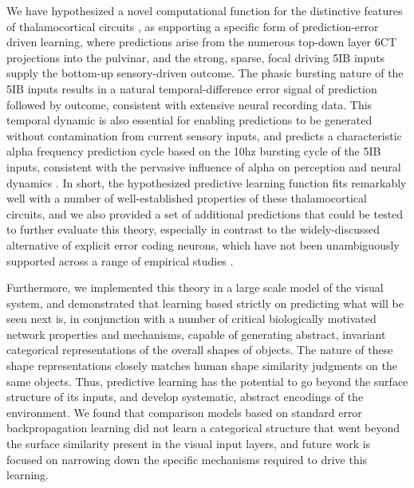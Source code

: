 \documentclass[11pt,twoside]{article}
\newif\myifpdf
\begin{document}
We have hypothesized a novel computational function for the distinctive features of thalamocortical circuits \citep{ShermanGuillery06,UsreySherman18}, as supporting a specific form of prediction-error driven learning, where predictions arise from the numerous top-down layer 6CT projections into the pulvinar, and the strong, sparse, focal driving 5IB inputs supply the bottom-up sensory-driven outcome. The phasic bursting nature of the 5IB inputs results in a natural temporal-difference error signal of prediction followed by outcome, consistent with extensive neural recording data.  This temporal dynamic is also essential for enabling predictions to be generated without contamination from current sensory inputs, and predicts a characteristic alpha frequency prediction cycle based on the 10hz bursting cycle of the 5IB inputs, consistent with the pervasive influence of alpha on perception and neural dynamics \citep{JensenBonnefondMarshallEtAl15,VanRullen16,ClaytonYeungKadosh18,FosterAwh19}.  In short, the hypothesized predictive learning function fits remarkably well with a number of well-established properties of these thalamocortical circuits, and we also provided a set of additional predictions that could be tested to further evaluate this theory, especially in contrast to the widely-discussed alternative of explicit error coding neurons, which have not been unambiguously supported across a range of empirical studies \citep{WalshMcGovernClarkEtAl20}.

Furthermore, we implemented this theory in a large scale model of the visual system, and demonstrated that learning based strictly on predicting what will be seen next is, in conjunction with a number of critical biologically motivated network properties and mechanisms, capable of generating abstract, invariant categorical representations of the overall shapes of objects.  The nature of these shape representations closely matches human shape similarity judgments on the same objects.  Thus, predictive learning has the potential to go beyond the surface structure of its inputs, and develop systematic, abstract encodings of the environment.   We found that comparison models based on standard error backpropagation learning did not learn a categorical structure that went beyond the surface similarity present in the visual input layers, and future work is focused on narrowing down the specific mechanisms required to drive this learning.
\end{document}
